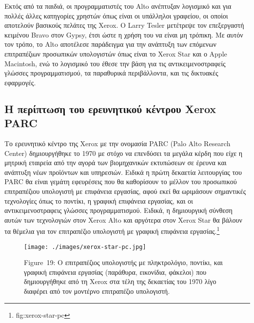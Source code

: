 \documentclass[
]{article}
\begin{document}
Εκτός από τα παιδιά, οι προγραμματιστές του Alto ανέπτυξαν λογισμικό και
για πολλές άλλες κατηγορίες χρηστών όπως είναι οι υπάλληλοι γραφείου, οι
οποίοι αποτελούν βασικούς πελάτες της Xerox. Ο Larry Tesler μετέτρεψε
τον επεξεργαστή κειμένου Bravo στον Gypsy, έτσι ώστε η χρήση του να
είναι μη τρόπικη. Με αυτόν τον τρόπο, το Alto αποτέλεσε παράδειγμα για
την ανάπτυξη των επόμενων επιτραπέζιων προσωπικών υπολογιστών όπως είναι
το Xerox Star και ο Apple Macintosh, ενώ το λογισμικό του έθεσε την βάση
για τις αντικειμενοστραφείς γλώσσες προγραμματισμού, τα παραθυρικά
περιβάλλοντα, και τις δικτυακές εφαρμογές.

\hypertarget{ux3b7-ux3c0ux3b5ux3c1ux3afux3c0ux3c4ux3c9ux3c3ux3b7-ux3c4ux3bfux3c5-ux3b5ux3c1ux3b5ux3c5ux3bdux3b7ux3c4ux3b9ux3baux3bfux3cd-ux3baux3adux3bdux3c4ux3c1ux3bfux3c5-xerox-parc}{%
\subsection{Η περίπτωση του ερευνητικού κέντρου Xerox
PARC}\label{ux3b7-ux3c0ux3b5ux3c1ux3afux3c0ux3c4ux3c9ux3c3ux3b7-ux3c4ux3bfux3c5-ux3b5ux3c1ux3b5ux3c5ux3bdux3b7ux3c4ux3b9ux3baux3bfux3cd-ux3baux3adux3bdux3c4ux3c1ux3bfux3c5-xerox-parc}}

Το ερευνητικό κέντρο της Xerox με την ονομασία PARC (Palo Alto Research
Center) δημιουργήθηκε το 1970 με στόχο να επενδύσει τα μεγάλα κέρδη που
είχε η μητρική εταιρεία από την αγορά των βιομηχανικών εκτυπώσεων σε
έρευνα και ανάπτυξη νέων προϊόντων και υπηρεσιών. Ειδικά η πρώτη
δεκαετία λειτουργίας του PARC θα είναι γεμάτη εφευρέσεις που θα
καθορίσουν το μέλλον του προσωπικού επιτραπέζιου υπολογιστή με επιφάνεια
εργασίας, αφού εκεί θα ωριμάσουν σημαντικές τεχνολογίες όπως το ποντίκι,
η γραφική επιφάνεια εργασίας, και οι αντικειμενοστραφεις γλώσσες
προγραμματισμού. Ειδικά, η δημιουργική σύνθεση αυτών των τεχνολογιών
στον Xerox Alto και αργότερα στον Xerox Star θα βάλουν τα θέμελια για
τον επιτραπέζιο υπολογιστή με γραφική επιφάνεια εργασίας.\footnote{fig:xerox-star-pc}

\leavevmode{}%
\begin{figure}
\hypertarget{fig:xerox-star-pc}{%
\centering
\texttt{[image: ./images/xerox-star-pc.jpg]}
\caption{Figure~19: Ο επιτραπέζιος υπολογιστής με πληκτρολόγιο, ποντίκι,
και γραφική επιφάνεια εργασίας (παράθυρα, εικονίδια, φάκελοι) που
δημιουργήθηκε από τη Xerox στα τέλη της δεκαετίας του 1970 λίγο διαφέρει
από τον μοντέρνο επιτραπέζιο υπολογιστή.}\label{fig:xerox-star-pc}
}
\end{figure}
\end{document}

